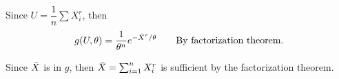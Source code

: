 Since $U = \dfrac{1}{n} \sum X_i^r$, then 
$$g(U, \theta) = \frac{1}{{\theta^n}} e^{-\bar{X}^r / \theta} \qquad \text{By factorization theorem.}$$

\nl Since $\bar{X}$ is in $g$, then $\bar{X} = \sum_{i=1}^n X_i^r$ is sufficient by the factorization theorem.